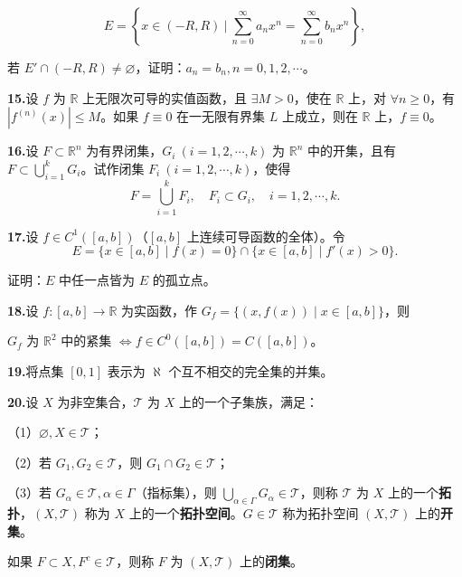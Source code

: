 \documentclass[11pt,a4paper]{article}
\begin{document}
\[E=\left\{x\in(-R,R)\ \bigg|\ \sum_{n=0}^\infty a_nx^n=\sum_{n=0}^\infty b_nx^n\right\},\]
\par\noindent 若 $E'\cap(-R,R)\ne\varnothing$，证明：$a_n=b_n,n=0,1,2,\cdots$。
\par{}\noindent\hypertarget{review-q15}{}\textbf{15.}\quad 设 $f$ 为 $\mathbb R$ 上无限次可导的实值函数，且 $\exists M>0$，使在 $\mathbb R$ 上，对 $\forall n\geq0$，有 $|f^{(n)}(x)|\leq M$。如果 $f\equiv0$ 在一无限有界集 $L$ 上成立，则在 $\mathbb R$ 上，$f\equiv0$。
\par{}\noindent\hypertarget{review-q16}{}\textbf{16.}\quad 设 $F\subset\mathbb R^n$ 为有界闭集，$G_i\ (i=1,2,\cdots,k)$ 为 $\mathbb R^n$ 中的开集，且有 $F\subset\bigcup_{i=1}^k G_i$。试作闭集 $F_i\ (i=1,2,\cdots,k)$，使得
\[F=\bigcup_{i=1}^k F_i,\quad F_i\subset G_i,\quad i=1,2,\cdots,k.\]
\par{}\noindent\hypertarget{review-q17}{}\textbf{17.}\quad 设 $f\in C^1([a,b])$（$[a,b]$ 上连续可导函数的全体）。令
\[E=\{x\in[a,b]\mid f(x)=0\}\cap\{x\in[a,b]\mid f'(x)>0\}.\]
\par\noindent 证明：$E$ 中任一点皆为 $E$ 的孤立点。
\par{}\noindent\hypertarget{review-q18}{}\textbf{18.}\quad 设 $f:[a,b]\to\mathbb R$ 为实函数，作 $G_f=\{(x,f(x))\mid x\in[a,b]\}$，则
\par\noindent $G_f$ 为 $\mathbb R^2$ 中的紧集 $\Leftrightarrow f\in C^0([a,b])=C([a,b])$。
\par{}\noindent\hypertarget{review-q19}{}\textbf{19.}\quad 将点集 $[0,1]$ 表示为 $\aleph$ 个互不相交的完全集的并集。
\par{}\noindent\hypertarget{review-q20}{}\textbf{20.}\quad 设 $X$ 为非空集合，$\mathcal T$ 为 $X$ 上的一个子集族，满足：
\par\noindent （1）$\varnothing,X\in\mathcal T$；
\par\noindent （2）若 $G_1,G_2\in\mathcal T$，则 $G_1\cap G_2\in\mathcal T$；
\par\noindent （3）若 $G_\alpha\in\mathcal T,\alpha\in\Gamma$（指标集），则 $\bigcup_{\alpha\in\Gamma} G_\alpha\in\mathcal T$，则称 $\mathcal T$ 为 $X$ 上的一个\textbf{拓扑}，$(X,\mathcal T)$ 称为 $X$ 上的一个\textbf{拓扑空间}。$G\in\mathcal T$ 称为拓扑空间 $(X,\mathcal T)$ 上的\textbf{开集}。
\par\noindent 如果 $F\subset X,F^c\in\mathcal T$，则称 $F$ 为 $(X,\mathcal T)$ 上的\textbf{闭集}。
\end{document}
